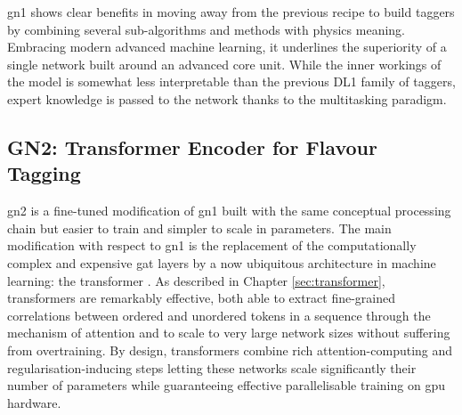 \gls{gn1} shows clear benefits in moving away from the previous recipe to build taggers by combining several sub-algorithms and methods with physics meaning. Embracing modern advanced machine learning, it underlines the superiority of a single network built around an advanced core unit. While the inner workings of the model is somewhat less interpretable than the previous DL1 family of taggers, expert knowledge is passed to the network thanks to the multitasking paradigm. %

\subsection{GN2: Transformer Encoder for Flavour Tagging}\label{chap-GN2}
\gls{gn2} is a fine-tuned modification of \gls{gn1} built with the same conceptual processing chain but easier to train and simpler to scale in parameters. The main modification with respect to \gls{gn1} is the replacement of the computationally complex and expensive \gls{gat} layers by a now ubiquitous architecture in machine learning: the transformer \cite{NIPS_transformerPaper}. As described in Chapter \ref{sec:transformer}, transformers are remarkably effective, both able to extract fine-grained correlations between ordered and unordered tokens in a sequence through the mechanism of attention and to scale to very large network sizes without suffering from overtraining. By design, transformers combine rich attention-computing and regularisation-inducing steps letting these networks scale significantly their number of parameters while guaranteeing effective parallelisable training on \gls{gpu} hardware.  \\

